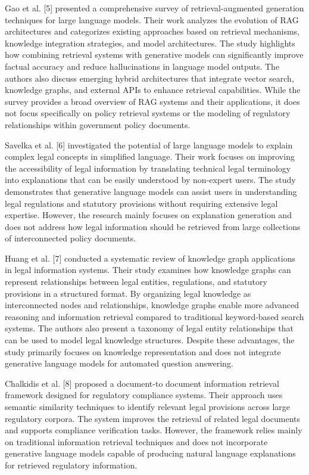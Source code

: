 \documentclass[conference]{IEEEtran}
\begin{document}
Gao et al. [5] presented a comprehensive survey of retrieval-augmented generation techniques for large language models. Their work analyzes the evolution of RAG architectures and categorizes existing approaches based on retrieval mechanisms, knowledge integration strategies, and model architectures. The study highlights how combining retrieval systems with generative models can significantly improve factual accuracy and reduce hallucinations in language model outputs. The authors also discuss emerging hybrid architectures that integrate vector search, knowledge graphs, and external APIs to enhance retrieval capabilities. While the survey provides a broad overview of RAG systems and their applications, it does not focus specifically on policy retrieval systems or the modeling of regulatory relationships within government policy documents.

Savelka et al. [6] investigated the potential of large language models to explain complex legal concepts in simplified language. Their work focuses on improving the accessibility of legal information by translating technical legal terminology into explanations that can be easily understood by non-expert users. The study demonstrates that generative language models can assist users in understanding legal regulations and statutory provisions without requiring extensive legal expertise. However, the research mainly focuses on explanation generation and does not address how legal information should be retrieved from large collections of interconnected policy documents.

Huang et al. [7] conducted a systematic review of knowledge graph applications in legal information systems. Their study examines how knowledge graphs can represent relationships between legal entities, regulations, and statutory provisions in a structured format. By organizing legal knowledge as interconnected nodes and relationships, knowledge graphs enable more advanced reasoning and information retrieval compared to traditional keyword-based search systems. The authors also present a taxonomy of legal entity relationships that can be used to model legal knowledge structures. Despite these advantages, the study primarily focuses on knowledge representation and does not integrate generative language models for automated question answering.

Chalkidis et al. [8] proposed a document-to document information retrieval framework designed for regulatory compliance systems. Their approach uses semantic similarity techniques to identify relevant legal provisions across large regulatory corpora. The system improves the retrieval of related legal documents and supports compliance verification tasks. However, the framework relies mainly on traditional information retrieval techniques and does not incorporate generative language models capable of producing natural language explanations for retrieved regulatory information.
\end{document}
